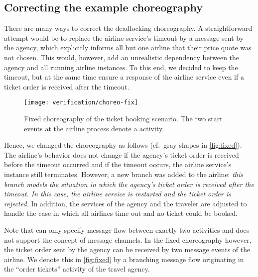 \subsection*{Correcting the example choreography}

There are many ways to correct the deadlocking choreography. A straightforward attempt would be to replace the airline service's timeout by a message sent by the agency, which explicitly informs all but one airline that their price quote was not chosen. This would, however, add an unrealistic dependency between the agency and all running airline instances. To this end, we decided to keep the timeout, but at the same time ensure a response of the airline service even if a ticket order is received after the timeout.

\begin{figure}
\centering
\texttt{[image: verification/choreo-fix]}
\caption{Fixed choreography of the ticket booking scenario. The two start events at the airline process denote a   activity.} \label{fig:fixed}
\end{figure}

Hence, we changed the choreography as follows (cf.~gray shapes in \autoref{fig:fixed}). The airline's behavior does not change if the agency's ticket order is received before the timeout occurred and if the timeout occurs, the airline service's instance still terminates. However, a new branch was added to the airline: \emph{this branch models the situation in which the agency's ticket order is received after the timeout. In this case, the airline service is restarted and the ticket order is rejected.} In addition, the services of the agency and the traveler are adjusted to handle the case in which all airlines time out and no ticket could be booked.

Note that  can only specify message flow between exactly two activities and does not support the concept of message channels. In the fixed choreography however, the ticket order sent by the agency can be received by two message events of the airline. We denote this in \autoref{fig:fixed} by a branching message flow originating in the ``order tickets'' activity of the travel agency.




